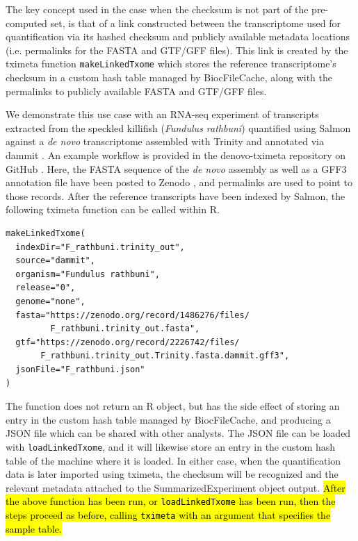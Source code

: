 The key concept used in the case when the checksum is not part of the
pre-computed set, is that of a link constructed between the
transcriptome used for quantification via its hashed checksum and
publicly available metadata locations (i.e. permalinks for the FASTA
and GTF/GFF files). This link is created by the tximeta function
\texttt{makeLinkedTxome} which stores the reference transcriptome's
checksum in a custom hash table managed by BiocFileCache, along with
the permalinks to publicly available FASTA and GTF/GFF files.

We demonstrate this use case with an RNA-seq experiment
\cite{killi-quant} of transcripts extracted from the speckled
killifish (\textit{Fundulus rathbuni}) 
quantified using Salmon \cite{salmon} against a \textit{de novo} transcriptome assembled with
Trinity \cite{trinity} and annotated via dammit \cite{dammit}. An
example workflow is provided in the denovo-tximeta repository on
GitHub \cite{denovo}. Here, the FASTA sequence of the
\textit{de novo} assembly as well as a GFF3 annotation file have been
posted to Zenodo \cite{killi-fasta,killi-gff}, and
permalinks are used to point to those 
records. After the reference transcripts have been indexed by Salmon,
the following tximeta function can be called within R.

\begin{verbatim}
makeLinkedTxome(
  indexDir="F_rathbuni.trinity_out", 
  source="dammit",
  organism="Fundulus rathbuni", 
  release="0", 
  genome="none",
  fasta="https://zenodo.org/record/1486276/files/
         F_rathbuni.trinity_out.fasta",
  gtf="https://zenodo.org/record/2226742/files/
       F_rathbuni.trinity_out.Trinity.fasta.dammit.gff3",
  jsonFile="F_rathbuni.json"
)
\end{verbatim}

The function does not return an R object, but has the side effect of
storing an entry in the custom hash table managed by BiocFileCache,
and producing a JSON file which can be shared with other analysts. The
JSON file can be loaded with \texttt{loadLinkedTxome}, and it will
likewise store an entry in the custom hash table of the machine where
it is loaded. In either case, when the quantification data \citep{killi-quant} is later
imported using tximeta, the checksum will be recognized and the
relevant metadata attached to the SummarizedExperiment object output.
\hl{After the above function has been run, or \texttt{loadLinkedTxome} has
been run, then the steps proceed as before, calling \texttt{tximeta}
with an argument that specifies the sample table.}

